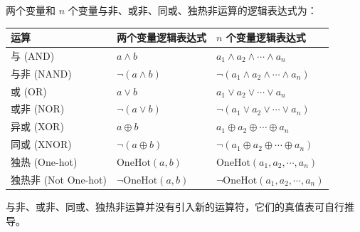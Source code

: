 两个变量和 $n$ 个变量与非、或非、同或、独热非运算的逻辑表达式为：

\begin{longtable}{|l|l|l|}
\hline
\textbf{运算} & \textbf{两个变量逻辑表达式} & \textbf{$n$ 个变量逻辑表达式} \\ \hline
\endhead
与 (AND) & $a \land b$ & $a_1 \land a_2 \land \cdots \land a_n$ \\ \hline
与非 (NAND) & $\lnot (a \land b)$ & $\lnot (a_1 \land a_2 \land \cdots \land a_n)$ \\ \hline
或 (OR) & $a \lor b$ & $a_1 \lor a_2 \lor \cdots \lor a_n$ \\ \hline
或非 (NOR) & $\lnot (a \lor b)$ & $\lnot (a_1 \lor a_2 \lor \cdots \lor a_n)$ \\ \hline
异或 (XOR) & $a \oplus b$ & $a_1 \oplus a_2 \oplus \cdots \oplus a_n$ \\ \hline
同或 (XNOR) & $\lnot (a \oplus b)$ & $\lnot (a_1 \oplus a_2 \oplus \cdots \oplus a_n)$ \\ \hline
独热 (One-hot) & $\mathrm{OneHot}(a, b)$ & $\mathrm{OneHot}(a_1, a_2, \cdots, a_n)$ \\ \hline
独热非 (Not One-hot) & $\lnot \mathrm{OneHot}(a, b)$ & $\lnot \mathrm{OneHot}(a_1, a_2, \cdots, a_n)$ \\ \hline
\end{longtable}

与非、或非、同或、独热非运算并没有引入新的运算符，它们的真值表可自行推导。
